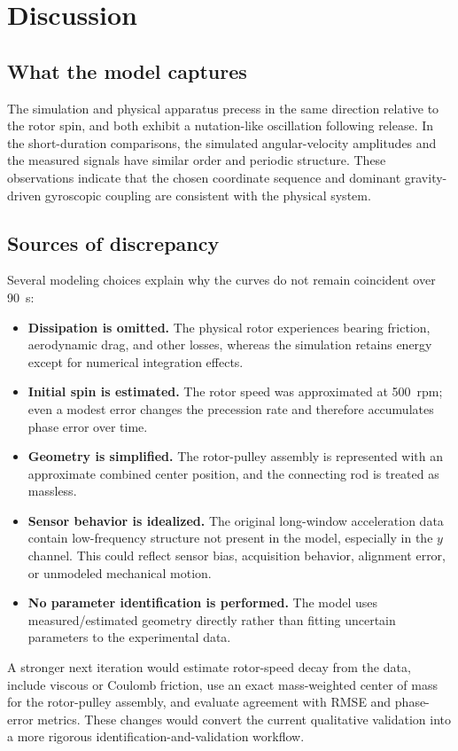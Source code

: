 \documentclass[11pt]{article}
\begin{document}
\section{Discussion}
\subsection{What the model captures}
The simulation and physical apparatus precess in the same direction relative to the rotor spin, and both exhibit a nutation-like oscillation following release. In the short-duration comparisons, the simulated angular-velocity amplitudes and the measured signals have similar order and periodic structure. These observations indicate that the chosen coordinate sequence and dominant gravity-driven gyroscopic coupling are consistent with the physical system.

\subsection{Sources of discrepancy}
Several modeling choices explain why the curves do not remain coincident over \SI{90}{s}:
\begin{itemize}
    \item \textbf{Dissipation is omitted.} The physical rotor experiences bearing friction, aerodynamic drag, and other losses, whereas the simulation retains energy except for numerical integration effects.
    \item \textbf{Initial spin is estimated.} The rotor speed was approximated at \SI{500}{rpm}; even a modest error changes the precession rate and therefore accumulates phase error over time.
    \item \textbf{Geometry is simplified.} The rotor-pulley assembly is represented with an approximate combined center position, and the connecting rod is treated as massless.
    \item \textbf{Sensor behavior is idealized.} The original long-window acceleration data contain low-frequency structure not present in the model, especially in the $y$ channel. This could reflect sensor bias, acquisition behavior, alignment error, or unmodeled mechanical motion.
    \item \textbf{No parameter identification is performed.} The model uses measured/estimated geometry directly rather than fitting uncertain parameters to the experimental data.
\end{itemize}

A stronger next iteration would estimate rotor-speed decay from the data, include viscous or Coulomb friction, use an exact mass-weighted center of mass for the rotor-pulley assembly, and evaluate agreement with RMSE and phase-error metrics. These changes would convert the current qualitative validation into a more rigorous identification-and-validation workflow.
\end{document}
